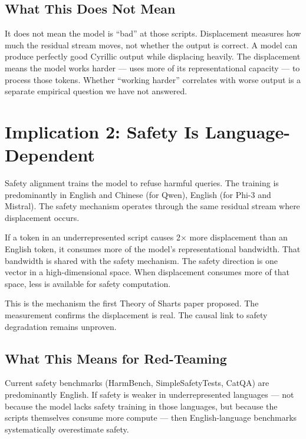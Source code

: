 \documentclass[11pt,a4paper]{article}
\begin{document}
\subsection{What This Does Not Mean}

It does not mean the model is ``bad'' at those scripts. Displacement measures how much the residual stream moves, not whether the output is correct. A model can produce perfectly good Cyrillic output while displacing heavily. The displacement means the model works harder --- uses more of its representational capacity --- to process those tokens. Whether ``working harder'' correlates with worse output is a separate empirical question we have not answered.

\section{Implication 2: Safety Is Language-Dependent}

Safety alignment trains the model to refuse harmful queries. The training is predominantly in English and Chinese (for Qwen), English (for Phi-3 and Mistral). The safety mechanism operates through the same residual stream where displacement occurs.

If a token in an underrepresented script causes 2$\times$ more displacement than an English token, it consumes more of the model's representational bandwidth. That bandwidth is shared with the safety mechanism. The safety direction is one vector in a high-dimensional space. When displacement consumes more of that space, less is available for safety computation.

This is the mechanism the first Theory of Sharts paper proposed. The measurement confirms the displacement is real. The causal link to safety degradation remains unproven.

\subsection{What This Means for Red-Teaming}

Current safety benchmarks (HarmBench, SimpleSafetyTests, CatQA) are predominantly English. If safety is weaker in underrepresented languages --- not because the model lacks safety training in those languages, but because the scripts themselves consume more compute --- then English-language benchmarks systematically overestimate safety.
\end{document}
